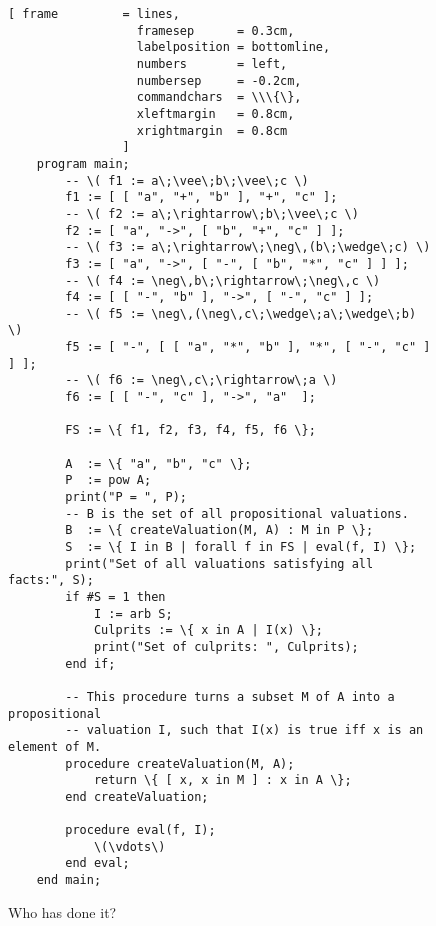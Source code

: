 \begin{figure}[!ht]
  \centering
\begin{Verbatim}[ frame         = lines, 
                  framesep      = 0.3cm, 
                  labelposition = bottomline,
                  numbers       = left,
                  numbersep     = -0.2cm,
                  commandchars  = \\\{\},
                  xleftmargin   = 0.8cm,
                  xrightmargin  = 0.8cm
                ]
    program main;
        -- \( f1 := a\;\vee\;b\;\vee\;c \)
        f1 := [ [ "a", "+", "b" ], "+", "c" ];
        -- \( f2 := a\;\rightarrow\;b\;\vee\;c \)
        f2 := [ "a", "->", [ "b", "+", "c" ] ];          
        -- \( f3 := a\;\rightarrow\;\neg\,(b\;\wedge\;c) \)
        f3 := [ "a", "->", [ "-", [ "b", "*", "c" ] ] ]; 
        -- \( f4 := \neg\,b\;\rightarrow\;\neg\,c \)
        f4 := [ [ "-", "b" ], "->", [ "-", "c" ] ]; 
        -- \( f5 := \neg\,(\neg\,c\;\wedge\;a\;\wedge\;b) \)
        f5 := [ "-", [ [ "a", "*", "b" ], "*", [ "-", "c" ] ] ]; 
        -- \( f6 := \neg\,c\;\rightarrow\;a \)
        f6 := [ [ "-", "c" ], "->", "a"  ];
    
        FS := \{ f1, f2, f3, f4, f5, f6 \};
    
        A  := \{ "a", "b", "c" \};
        P  := pow A;
        print("P = ", P);
        -- B is the set of all propositional valuations.
        B  := \{ createValuation(M, A) : M in P \};
        S  := \{ I in B | forall f in FS | eval(f, I) \};
        print("Set of all valuations satisfying all facts:", S);
        if #S = 1 then
            I := arb S;
            Culprits := \{ x in A | I(x) \};
            print("Set of culprits: ", Culprits);
        end if;
    
        -- This procedure turns a subset M of A into a propositional 
        -- valuation I, such that I(x) is true iff x is an element of M.
        procedure createValuation(M, A);
            return \{ [ x, x in M ] : x in A \};
        end createValuation;
    
        procedure eval(f, I);
            \(\vdots\)
        end eval;
    end main;
\end{Verbatim}
\vspace*{-0.3cm}
  \caption{Who has done it?}
  \label{fig:watson}
\end{figure}

